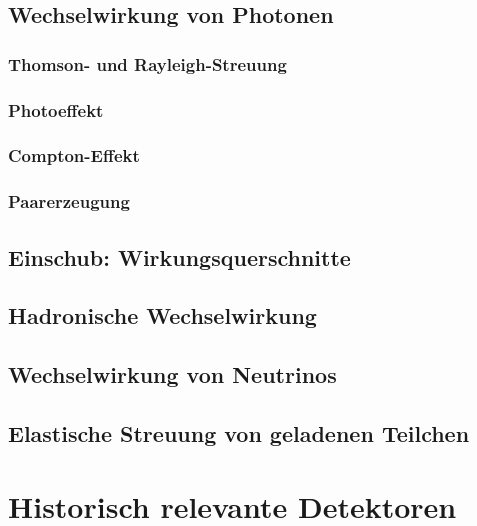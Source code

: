 \documentclass{article}
\begin{document}
\graphicspath{{bilder/1-2/}}
	\subsection{Wechselwirkung von Photonen}
		
			\subsubsection{Thomson- und Rayleigh-Streuung}
				
			\subsubsection{Photoeffekt}
				 
			\subsubsection{Compton-Effekt}
				
			\subsubsection{Paarerzeugung}
				
	\subsection{Einschub: Wirkungsquerschnitte}
		
				
\graphicspath{{bilder/1-345/}}
	\subsection{Hadronische Wechselwirkung}
		
	\subsection{Wechselwirkung von Neutrinos}
		
	\subsection{Elastische Streuung von geladenen Teilchen}
		
		
\section{Historisch relevante Detektoren}
\graphicspath{{bilder/2/}}
		
		
		
		
\end{document}
